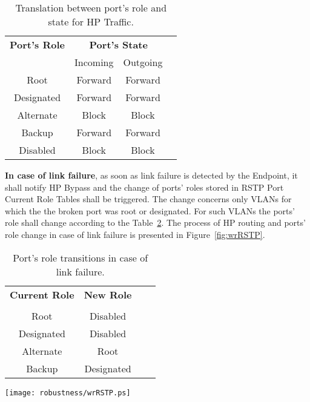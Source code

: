 \begin{table}[ht]
\caption{Translation between port's role and state for HP Traffic.} 
\centering
	\begin{tabular}{| c | c | c | c |}          \hline
\textbf{Port's Role}& \multicolumn{2}{|c|}{\textbf{Port's State}}  \\
                    & Incoming   & Outgoing     \\ \hline
Root                & Forward    & Forward      \\ \hline
Designated          & Forward    & Forward      \\ \hline
Alternate           & Block      & Block        \\ \hline
Backup              & Forward    & Forward      \\ \hline
Disabled            & Block      & Block        \\ \hline
\end{tabular}
\label{tab:portRoleStatetrans}
\end{table}

\textbf{In case of link failure}, as soon as link failure is detected by the
Endpoint, it shall notify HP Bypass and the change of ports' roles stored in
RSTP Port Current Role Tables shall be triggered. The change concerns only VLANs
for which the the broken port was root or designated. For such VLANs the ports'
role shall change according to the Table~\ref{tab:portRoleTransition}.
The process of HP routing and ports' role change in case of link failure is
presented in Figure~\ref{fig:wrRSTP}.

\begin{table}[ht]
\caption{Port's role transitions in case of link failure.} 
\centering
	\begin{tabular}{| c | c | c | c |}          \hline
\textbf{Current Role}& \textbf{New Role}  \\
                     &               \\ \hline
Root                 & Disabled      \\ \hline
Designated           & Disabled      \\ \hline
Alternate            & Root          \\ \hline
Backup               & Designated    \\ \hline
\end{tabular}
\label{tab:portRoleTransition}
\end{table}

\begin{center}
	\texttt{[image: robustness/wrRSTP.ps]}
	\label{fig:wrRSTP}
\end{center}
